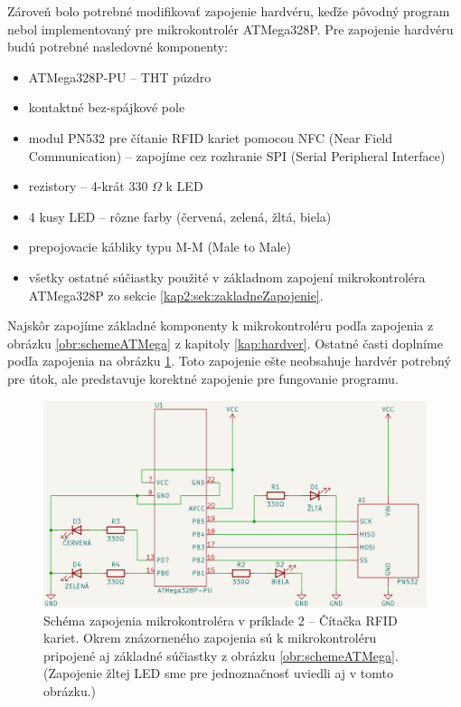 Zároveň bolo potrebné modifikovať zapojenie hardvéru, keďže pôvodný program nebol implementovaný pre mikrokontrolér ATMega328P. Pre zapojenie hardvéru budú potrebné nasledovné komponenty:
\begin{itemize}
    \item ATMega328P-PU -- THT púzdro
    \item kontaktné bez-spájkové pole
    \item modul PN532 pre čítanie RFID kariet pomocou NFC (Near Field Communication) -- zapojíme cez rozhranie SPI (Serial Peripheral Interface)
    \item rezistory -- 4-krát 330 $\Omega$ k LED
    \item 4 kusy LED -- rôzne farby (červená, zelená, žltá, biela)
    \item prepojovacie kábliky typu M-M (Male to Male)
    \item všetky ostatné súčiastky použité v základnom zapojení mikrokontroléra ATMega328P zo sekcie \ref{kap2:sek:zakladneZapojenie}.
\end{itemize}
Najskôr zapojíme základné komponenty k mikrokontroléru podľa zapojenia z obrázku \ref{obr:schemeATMega} z kapitoly \ref{kap:hardver}. Ostatné časti doplníme podľa zapojenia na obrázku \ref{obr:schemeRFID}. Toto zapojenie ešte neobsahuje hardvér potrebný pre útok, ale predstavuje korektné zapojenie pre fungovanie programu.

\begin{figure}
    \centerline{\includegraphics[width=1\textwidth]{images/schemeRFID.png}}
    \caption[Schéma zapojenia mikrokontroléra v príklade 2]{Schéma zapojenia mikrokontroléra v príklade 2 -- Čítačka RFID kariet. Okrem znázorneného zapojenia sú k mikrokontroléru pripojené aj základné súčiastky z obrázku \ref{obr:schemeATMega}. (Zapojenie žltej LED sme pre jednoznačnosť uviedli aj v tomto obrázku.)}
    \label{obr:schemeRFID}
\end{figure}

